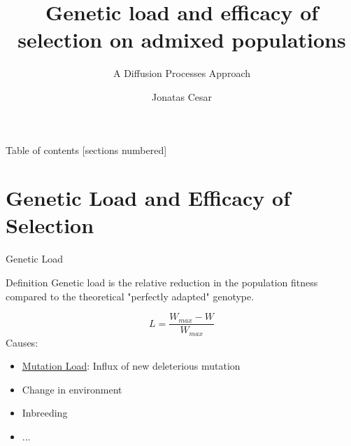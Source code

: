 \documentclass[10pt]{beamer}
\title{Genetic load and efficacy of selection on admixed populations}
\subtitle{A Diffusion Processes Approach}
\date{}
\author{Jonatas Cesar}
\institute{University of S\~ao Paulo \& University of Chicago}
\begin{document}
\maketitle

\begin{frame}{Table of contents}
  [sections numbered]
  \tableofcontents[hideallsubsections]
\end{frame}

\section{Genetic Load and Efficacy of Selection}

\begin{frame}{Genetic Load}
  \begin{alertblock}{Definition}
    Genetic load is the relative reduction in the population fitness compared
    to the theoretical "perfectly adapted" genotype.
  \end{alertblock}
  \[
    L = \frac{W_{max} - W}{W_{max}}
  \]
  Causes:
  \begin{itemize}
    \item \underline{Mutation Load}: Influx of new deleterious mutation
    \item Change in environment
    \item Inbreeding 
    \item ...
  \end{itemize}
\end{frame}
\end{document}
